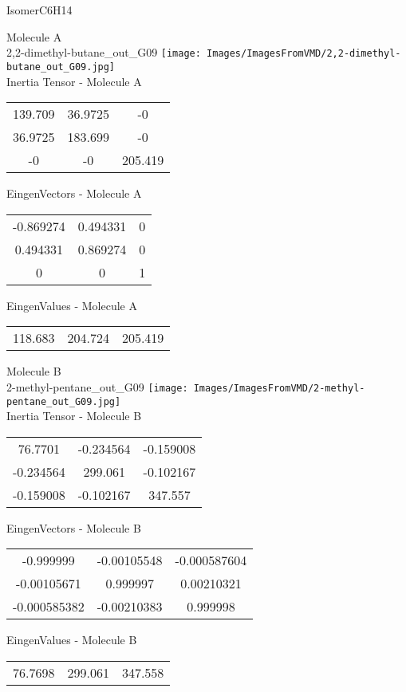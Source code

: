 \vtab[-2cm]
\begin{center}
{\large IsomerC6H14}
\end{center}
\begin{multicols}{2}
\begin{center}
Molecule A \\ 
2,2-dimethyl-butane\_out\_G09
\texttt{[image: Images/ImagesFromVMD/2,2-dimethyl-butane\_out\_G09.jpg]}
\\
Inertia Tensor - Molecule A \\
\vtab
\begin{tabular}{|c c c|}
139.709	 & 	36.9725	 & 	-0	 \\
36.9725	 & 	183.699	 & 	-0	 \\
-0	 & 	-0	 & 	205.419
\end{tabular}

\vtab
 EingenVectors - Molecule A     \\
\vtab
\begin{tabular}{|c c c|}
-0.869274	 & 	0.494331	 & 	0	 \\
0.494331	 & 	0.869274	 & 	0	 \\
0	 & 	0	 & 	1
\end{tabular}

\vtab
 EingenValues - Molecule A     \\
\vtab
\begin{tabular}{|c c c|}
118.683	 & 	204.724	 & 	205.419
\end{tabular}
\columnbreak

Molecule B \\ 
2-methyl-pentane\_out\_G09
\texttt{[image: Images/ImagesFromVMD/2-methyl-pentane\_out\_G09.jpg]}
\\
Inertia Tensor - Molecule B \\
\vtab
\begin{tabular}{|c c c|}
76.7701	 & 	-0.234564	 & 	-0.159008	 \\
-0.234564	 & 	299.061	 & 	-0.102167	 \\
-0.159008	 & 	-0.102167	 & 	347.557
\end{tabular}

\vtab
 EingenVectors - Molecule B     \\
\vtab
\begin{tabular}{|c c c|}
-0.999999	 & 	-0.00105548	 & 	-0.000587604	 \\
-0.00105671	 & 	0.999997	 & 	0.00210321	 \\
-0.000585382	 & 	-0.00210383	 & 	0.999998
\end{tabular}

\vtab
 EingenValues - Molecule B     \\
\vtab
\begin{tabular}{|c c c|}
76.7698	 & 	299.061	 & 	347.558
\end{tabular}

\end{center}
\end{multicols}
